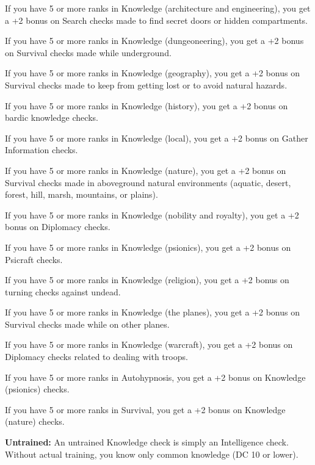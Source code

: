 If you have 5 or more ranks in Knowledge (architecture and engineering), you get a +2 bonus on Search checks made to find secret doors or hidden compartments.

If you have 5 or more ranks in Knowledge (dungeoneering), you get a +2 bonus on Survival checks made while underground.

If you have 5 or more ranks in Knowledge (geography), you get a +2 bonus on Survival checks made to keep from getting lost or to avoid natural hazards.

If you have 5 or more ranks in Knowledge (history), you get a +2 bonus on bardic knowledge checks.

If you have 5 or more ranks in Knowledge (local), you get a +2 bonus on Gather Information checks.

If you have 5 or more ranks in Knowledge (nature), you get a +2 bonus on Survival checks made in aboveground natural environments (aquatic, desert, forest, hill, marsh, mountains, or plains).

If you have 5 or more ranks in Knowledge (nobility and royalty), you get a +2 bonus on Diplomacy checks.

If you have 5 or more ranks in Knowledge (psionics), you get a +2 bonus on Psicraft checks.

If you have 5 or more ranks in Knowledge (religion), you get a +2 bonus on turning checks against undead.

If you have 5 or more ranks in Knowledge (the planes), you get a +2 bonus on Survival checks made while on other planes.

If you have 5 or more ranks in Knowledge (warcraft), you get a +2 bonus on Diplomacy checks related to dealing with troops.

If you have 5 or more ranks in Autohypnosis, you get a +2 bonus on Knowledge (psionics) checks.

If you have 5 or more ranks in Survival, you get a +2 bonus on Knowledge (nature) checks.

\textbf{Untrained:} An untrained Knowledge check is simply an Intelligence check. Without actual training, you know only common knowledge (DC 10 or lower).


